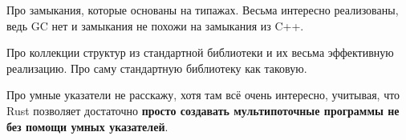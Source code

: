 \begin{frame}{\insertsubsection}
{  }

   {

    Про замыкания, которые основаны на типажах. Весьма интересно реализованы,
    ведь GC нет и замыкания не похожи на замыкания из C++.

  }

   {

    Про коллекции структур из стандартной библиотеки и их весьма эффективную
    реализацию. Про саму стандартную библиотеку как таковую.

    Про умные указатели не расскажу, хотя там всё очень интересно, учитывая, что
    Rust позволяет достаточно \textbf{просто создавать мультипоточные программы
      не без помощи умных указателей}.

  }



\end{frame}
